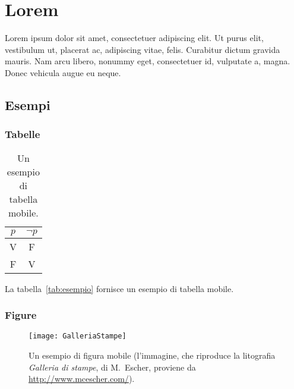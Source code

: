
\chapter{Lorem}
\label{cap:lorem}

Lorem ipsum dolor sit amet, consectetuer adipiscing elit. Ut purus elit, vestibulum ut, placerat ac, adipiscing vitae, felis. Curabitur dictum gravida mauris. Nam arcu libero, nonummy eget, consectetuer id, vulputate a, magna. Donec vehicula augue eu neque.

\section{Esempi}

\subsection{Tabelle}

\lipsum

\begin{table}[tb]
\caption[Un esempio di tabella mobile]{Un esempio di tabella mobile.}
\label{tab:esempio}
\centering
\begin{tabular}{cc}
\toprule
$p$ & $\lnot p$ \\ 
\midrule
V   & F \\ 
F   & V \\
\bottomrule 
\end{tabular}
\end{table}

La tabella~\vref{tab:esempio} fornisce un esempio di tabella mobile.

\lipsum[1-2]


\subsection{Figure}

\lipsum[2]

\begin{figure}[tb] 
\centering 
\texttt{[image: GalleriaStampe]} 
\caption[Un esempio di figura mobile]{Un esempio di figura mobile (l'immagine, che riproduce la litografia \emph{Galleria di stampe}, di M.~Escher, proviene da \url{http://www.mcescher.com/}).}
\label{fig:galleria} 
\end{figure}

